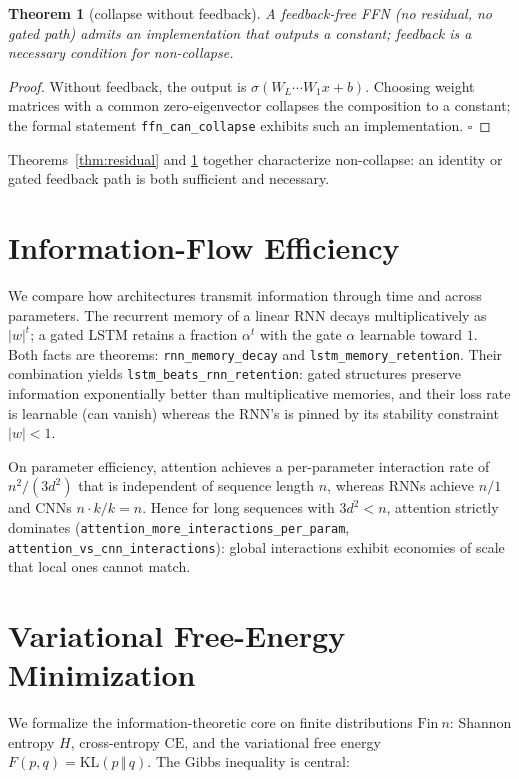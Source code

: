 \documentclass[conference]{IEEEtran}
\newtheorem{theorem}{Theorem}
\begin{document}
\begin{theorem}[collapse without feedback]
\label{thm:collapse}
A feedback-free FFN (no residual, no gated path) admits an implementation that
outputs a constant; feedback is a necessary condition for non-collapse.
\end{theorem}

\begin{proof}
Without feedback, the output is $\sigma(W_L\cdots W_1 x+b)$. Choosing weight
matrices with a common zero-eigenvector collapses the composition to a
constant; the formal statement \texttt{ffn\_can\_collapse} exhibits such an
implementation. \hfill$\square$
\end{proof}

Theorems~\ref{thm:residual} and \ref{thm:collapse} together characterize
non-collapse: an identity or gated feedback path is both sufficient and
necessary.

\section{Information-Flow Efficiency}
\label{sec:info}
We compare how architectures transmit information through time and across
parameters. The recurrent memory of a linear RNN decays multiplicatively as
$|w|^t$; a gated LSTM retains a fraction $\alpha^t$ with the gate $\alpha$
learnable toward $1$. Both facts are theorems:
\texttt{rnn\_memory\_decay} and \texttt{lstm\_memory\_retention}. Their
combination yields \texttt{lstm\_beats\_rnn\_retention}: gated structures
preserve information exponentially better than multiplicative memories, and
their loss rate is learnable (can vanish) whereas the RNN's is pinned by its
stability constraint $|w|<1$.

On parameter efficiency, attention achieves a per-parameter interaction rate of
$n^2/(3d^2)$ that is independent of sequence length $n$, whereas RNNs achieve
$n/1$ and CNNs $n\cdot k/k=n$. Hence for long sequences with $3d^2<n$, attention
strictly dominates (\texttt{attention\_more\_interactions\_per\_param},
\texttt{attention\_vs\_cnn\_interactions}): global interactions exhibit
economies of scale that local ones cannot match.

\section{Variational Free-Energy Minimization}
\label{sec:fem}
We formalize the information-theoretic core on finite distributions
$\mathrm{Fin}\ n$: Shannon entropy $H$, cross-entropy $\mathrm{CE}$, and the
variational free energy $F(p,q)=\mathrm{KL}(p\,\Vert\,q)$. The Gibbs inequality
is central:
\end{document}
